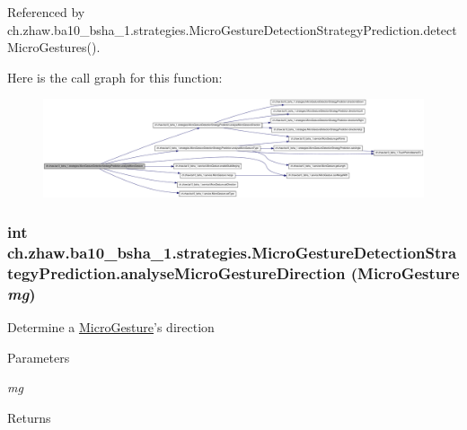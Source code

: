 Referenced by ch.zhaw.ba10\_\-bsha\_\-1.strategies.MicroGestureDetectionStrategyPrediction.detectMicroGestures().

Here is the call graph for this function:\nopagebreak
\begin{figure}[H]
\begin{center}
\leavevmode
\includegraphics[width=420pt]{classch_1_1zhaw_1_1ba10__bsha__1_1_1strategies_1_1MicroGestureDetectionStrategyPrediction_a741f6f5dfadc6a6ad25f03088ff55fc9_cgraph}
\end{center}
\end{figure}
\hypertarget{classch_1_1zhaw_1_1ba10__bsha__1_1_1strategies_1_1MicroGestureDetectionStrategyPrediction_a756c6343fc5cb131a57b00f638ca1c3d}{
\subsubsection[{analyseMicroGestureDirection}]{\setlength{\rightskip}{0pt plus 5cm}int ch.zhaw.ba10\_\-bsha\_\-1.strategies.MicroGestureDetectionStrategyPrediction.analyseMicroGestureDirection ({\bf MicroGesture} {\em mg})}}
\label{classch_1_1zhaw_1_1ba10__bsha__1_1_1strategies_1_1MicroGestureDetectionStrategyPrediction_a756c6343fc5cb131a57b00f638ca1c3d}
Determine a \hyperlink{}{MicroGesture}'s direction


\begin{DoxyParams}{Parameters}
\item[{\em mg}]\end{DoxyParams}
\begin{DoxyReturn}{Returns}

\end{DoxyReturn}


